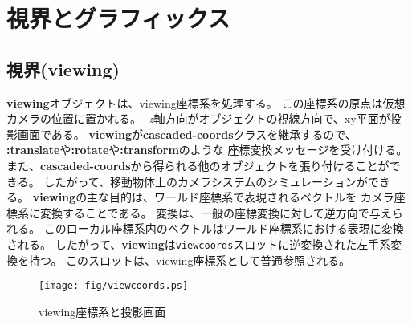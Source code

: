 \section{視界とグラフィックス}

\subsection{視界(viewing)}
{\bf viewing}オブジェクトは、viewing座標系を処理する。
この座標系の原点は仮想カメラの位置に置かれる。
{\em -z}軸方向がオブジェクトの視線方向で、xy平面が投影画面である。
{\bf viewing}が{\bf cascaded-coords}クラスを継承するので、
{\bf :translate}や{\bf :rotate}や{\bf :transform}のような
座標変換メッセージを受け付ける。
また、{\bf cascaded-coords}から得られる他のオブジェクトを張り付けることができる。
したがって、移動物体上のカメラシステムのシミュレーションができる。
{\bf viewing}の主な目的は、ワールド座標系で表現されるベクトルを
カメラ座標系に変換することである。
変換は、一般の座標変換に対して逆方向で与えられる。
このローカル座標系内のベクトルはワールド座標系における表現に変換される。
したがって、{\bf viewing}は{\tt viewcoords}スロットに逆変換された左手系変換を持つ。
このスロットは、viewing座標系として普通参照される。

\begin{figure}
\begin{center}
\texttt{[image: fig/viewcoords.ps]}
\end{center}
\caption{viewing座標系と投影画面}
\end{figure}

